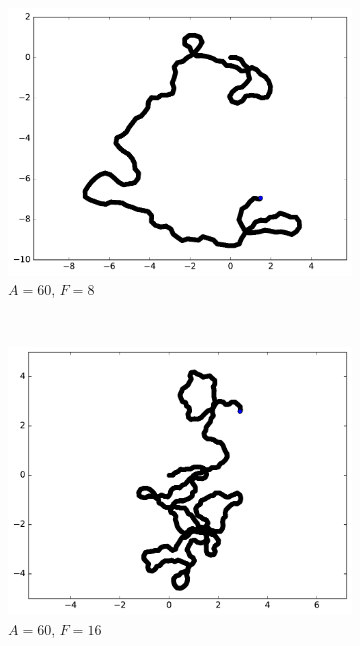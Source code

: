 \begin{figure}[htb]
\begin{subfigure}[t]{\subImgWmo}
			\includegraphics[width=\textwidth]{figures/ch3/synTraj_219_60_8}
			\caption[$A = 60$, $F=8$]{$A = 60$, $F=8$}
			\label{fig:synTraj_219_60_8}
		\end{subfigure}
		~
		\begin{subfigure}[t]{\subImgWmo}
			\centering
			\includegraphics[width=\textwidth]{figures/ch3/synTraj_219_60_16}
			\caption[$A = 60$, $F=16$]{$A = 60$, $F=16$}
			\label{fig:synTraj_219_60_16}
		\end{subfigure}
		~
		\begin{subfigure}[t]{\subImgWmo}
			\centering

\end{subfigure}
\end{figure}
